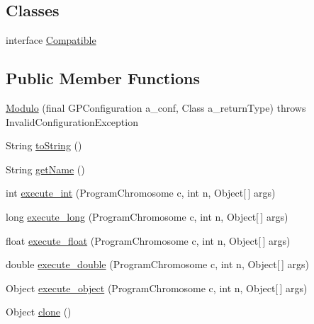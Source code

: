 \subsection*{Classes}
\begin{DoxyCompactItemize}
\item 
interface \hyperlink{interfaceorg_1_1jgap_1_1gp_1_1function_1_1_modulo_1_1_compatible}{Compatible}
\end{DoxyCompactItemize}
\subsection*{Public Member Functions}
\begin{DoxyCompactItemize}
\item 
\hyperlink{classorg_1_1jgap_1_1gp_1_1function_1_1_modulo_ad35b5383f11264aa696edf9714827efe}{Modulo} (final G\-P\-Configuration a\-\_\-conf, Class a\-\_\-return\-Type)  throws Invalid\-Configuration\-Exception 
\item 
String \hyperlink{classorg_1_1jgap_1_1gp_1_1function_1_1_modulo_a045f19110f20af2807aa590f6298218d}{to\-String} ()
\item 
String \hyperlink{classorg_1_1jgap_1_1gp_1_1function_1_1_modulo_a6774d099e7fb16b7814d6211622bac8c}{get\-Name} ()
\item 
int \hyperlink{classorg_1_1jgap_1_1gp_1_1function_1_1_modulo_a5aec0b7b5eeb415ea5abeadd5edde7d1}{execute\-\_\-int} (Program\-Chromosome c, int n, Object\mbox{[}$\,$\mbox{]} args)
\item 
long \hyperlink{classorg_1_1jgap_1_1gp_1_1function_1_1_modulo_a267daf25b1232bbb8f754743a1f1d1d2}{execute\-\_\-long} (Program\-Chromosome c, int n, Object\mbox{[}$\,$\mbox{]} args)
\item 
float \hyperlink{classorg_1_1jgap_1_1gp_1_1function_1_1_modulo_adc2df77b64182027705fafaba3299c43}{execute\-\_\-float} (Program\-Chromosome c, int n, Object\mbox{[}$\,$\mbox{]} args)
\item 
double \hyperlink{classorg_1_1jgap_1_1gp_1_1function_1_1_modulo_acfca5b319c75d55055771064c52d0673}{execute\-\_\-double} (Program\-Chromosome c, int n, Object\mbox{[}$\,$\mbox{]} args)
\item 
Object \hyperlink{classorg_1_1jgap_1_1gp_1_1function_1_1_modulo_a4c43a38c572cffc681ad96fc711a8a05}{execute\-\_\-object} (Program\-Chromosome c, int n, Object\mbox{[}$\,$\mbox{]} args)
\item 
Object \hyperlink{classorg_1_1jgap_1_1gp_1_1function_1_1_modulo_ae94685dc6eaac016c84e108605954baf}{clone} ()
\end{DoxyCompactItemize}
